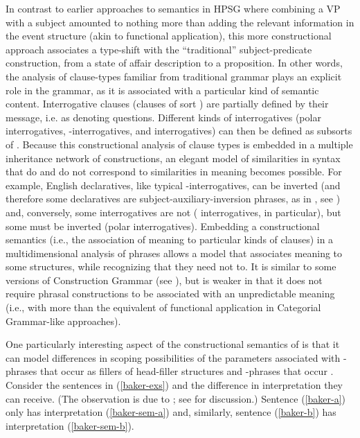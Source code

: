 \documentclass[output=paper]{langsci/langscibook}
\begin{document}
In contrast to earlier approaches to semantics in HPSG where combining a VP with a subject amounted to nothing more than adding the relevant information in the event structure (akin to functional application), this more constructional approach associates a type-shift with the ``traditional'' subject-predicate construction, from a state of affair description to a proposition. In other words, the analysis of clause-types familiar from traditional grammar plays an explicit role in the grammar, as it is associated  with a particular kind of semantic content.  Interrogative clauses (clauses of sort ) are partially defined by their message, i.e. as denoting questions. Different kinds of interrogatives (polar interrogatives, -interrogatives, and  interrogatives) can then be defined as subsorts of . Because this constructional analysis of clause types is embedded in a multiple inheritance network of constructions, an elegant model of similarities in syntax that do and do not correspond to similarities in meaning becomes possible. For example, English declaratives, like typical -interrogatives, can be inverted (and therefore some declaratives are subject-auxiliary-inversion phrases, as in , see \citealt{Fillmore1999}) and, conversely, some interrogatives are not ( interrogatives, in particular), but some must be inverted (polar interrogatives). Embedding a constructional semantics (i.e., the association of meaning to particular kinds of clauses) in a multidimensional analysis of phrases allows a model that associates meaning to some structures, while recognizing that they need not to. It is similar to some versions of Construction Grammar (see ), but is weaker in that it does not require phrasal constructions to be associated with an unpredictable meaning (i.e., with more than the equivalent of functional application in Categorial Grammar-like approaches). 

One particularly interesting aspect of the constructional semantics of \citet{GinzburgandSag2001} is that it can model differences in scoping possibilities of the parameters associated with -phrases that occur as fillers of head-filler structures and -phrases that occur . Consider the sentences in (\ref{baker-exs}) and the difference in interpretation they can receive. (The observation is due to \citealt{Baker1970a}; see \citealt[242--246]{GinzburgandSag2001} for discussion.) Sentence (\ref{baker-a}) only has interpretation (\ref{baker-sem-a}) and, similarly, sentence (\ref{baker-b}) has interpretation (\ref{baker-sem-b}).
\end{document}
